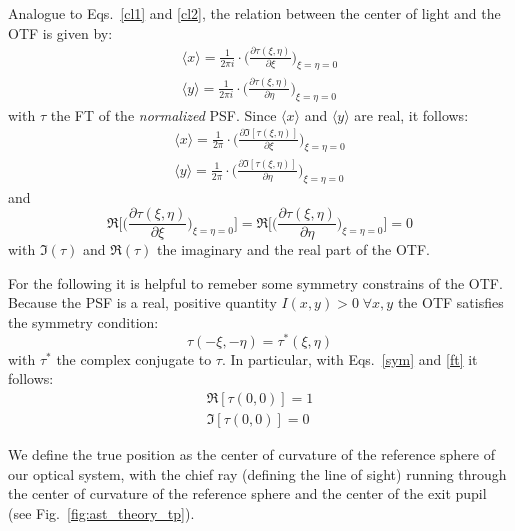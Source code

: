 Analogue to Eqs.~\ref{cl1} and \ref{cl2}, the relation between the center of light and the OTF is given by:
\begin{eqnarray}
\langle x \rangle = \frac{1}{2\pi i} \cdot \Big(\frac{\partial \tau(\xi, \eta)}{\partial \xi}\Big)_{\xi = \eta = 0} \\
\langle y \rangle = \frac{1}{2\pi i} \cdot \Big(\frac{\partial \tau(\xi, \eta)}{\partial \eta}\Big)_{\xi = \eta = 0}
\end{eqnarray}
with $\tau$ the FT of the {\it normalized} PSF. Since $\langle x \rangle$ and $\langle y \rangle$ are real, it follows:
\begin{eqnarray}
\langle x \rangle = \frac{1}{2\pi} \cdot \Big(\frac{\partial \Im[\tau(\xi, \eta)]}{\partial \xi}\Big)_{\xi = \eta = 0} \\
\langle y \rangle = \frac{1}{2\pi} \cdot \Big(\frac{\partial \Im[\tau(\xi, \eta)]}{\partial \eta}\Big)_{\xi = \eta = 0}
\end{eqnarray}
and
\begin{equation}\label{con1}
\Re\Bigg[\Big(\frac{\partial \tau(\xi, \eta)}{\partial \xi}\Big)_{\xi = \eta = 0}\Bigg] = \Re\Bigg[\Big(\frac{\partial \tau(\xi, \eta)}{\partial \eta}\Big)_{\xi = \eta = 0}\Bigg] = 0
\end{equation}
with $\Im(\tau)$ and $\Re(\tau)$ the imaginary and the real part of the OTF.

For the following it is helpful to remeber some symmetry constrains of the OTF.
Because the PSF is a real, positive quantity $I(x,y) > 0 \; \forall x,y$ the OTF satisfies the symmetry condition:
\begin{equation}\label{sym}
\tau(-\xi, -\eta) = \tau^{\ast}(\xi,\eta)
\end{equation}
with $\tau^{\ast}$ the complex conjugate to $\tau$. In particular, with Eqs.~\ref{sym} and \ref{ft} it follows:
\begin{eqnarray}
\Re[\tau(0,0)] = 1 \\
\Im[\tau(0,0)] = 0 \label{con2}
\end{eqnarray}

We define the true position as the center of curvature of the reference sphere of our optical system, with the chief ray (defining the line of sight) running through the center of curvature of the reference sphere and the center of the exit pupil (see Fig.~\ref{fig:ast_theory_tp}).
